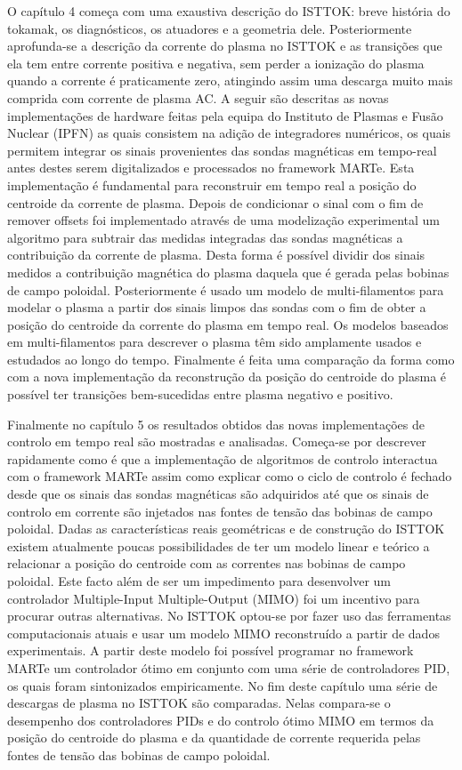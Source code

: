 O capítulo 4 começa com uma exaustiva descrição do ISTTOK: breve história do tokamak, os diagnósticos, os atuadores e a geometria dele. Posteriormente aprofunda-se a descrição da corrente do plasma no ISTTOK e as transições que ela tem entre corrente positiva e negativa, sem perder a ionização do plasma quando a corrente é praticamente zero, atingindo assim uma descarga muito mais comprida com corrente de plasma AC. A seguir  são descritas as novas implementações de hardware feitas pela equipa do Instituto de Plasmas e Fusão Nuclear (IPFN)  as quais consistem na adição de integradores numéricos, os quais permitem integrar os sinais provenientes das sondas magnéticas em tempo-real antes destes serem digitalizados e processados no framework MARTe. Esta implementação é fundamental para reconstruir em tempo real a posição do centroide da corrente de plasma.  Depois de condicionar o sinal com o fim de remover offsets foi implementado através de uma modelização experimental um algoritmo para subtrair das medidas integradas das sondas magnéticas a contribuição da corrente de plasma. Desta forma é possível dividir dos sinais medidos a contribuição magnética do plasma daquela que é gerada pelas bobinas de campo poloidal. Posteriormente é usado um modelo de multi-filamentos para modelar o plasma a partir dos sinais limpos das sondas com o fim de obter a posição do centroide da corrente do plasma em tempo real. Os modelos baseados em multi-filamentos para descrever o plasma têm sido amplamente usados e estudados ao longo do tempo.  Finalmente é feita  uma comparação da forma como com a nova implementação da reconstrução da posição do centroide do plasma é possível ter transições bem-sucedidas entre plasma negativo e positivo. \smallskip

Finalmente no capítulo 5 os resultados obtidos das novas implementações de controlo em tempo real são mostradas e analisadas. Começa-se por descrever rapidamente como é que a implementação de algoritmos de controlo interactua com o framework MARTe assim como explicar como o ciclo de controlo é fechado desde que os sinais das sondas magnéticas são adquiridos até que os sinais de controlo em corrente são injetados nas fontes de tensão das bobinas de campo poloidal. Dadas as características reais geométricas e de construção do ISTTOK existem atualmente poucas possibilidades de ter um modelo linear e teórico a relacionar a posição do centroide com as correntes nas bobinas de campo poloidal. Este facto além de ser um impedimento para desenvolver um controlador Multiple-Input Multiple-Output (MIMO) foi um incentivo para procurar outras alternativas. No ISTTOK optou-se por fazer uso das ferramentas computacionais atuais e usar um modelo MIMO reconstruído a partir de dados experimentais. A partir deste modelo foi possível programar no framework MARTe um controlador ótimo em conjunto com uma série de controladores PID, os quais foram sintonizados empiricamente. No fim deste capítulo  uma série de descargas de plasma no ISTTOK são comparadas. Nelas compara-se o desempenho dos controladores  PIDs e do controlo ótimo MIMO em termos da posição do centroide do plasma e da quantidade de corrente requerida pelas fontes de tensão das bobinas de campo poloidal. \smallskip

